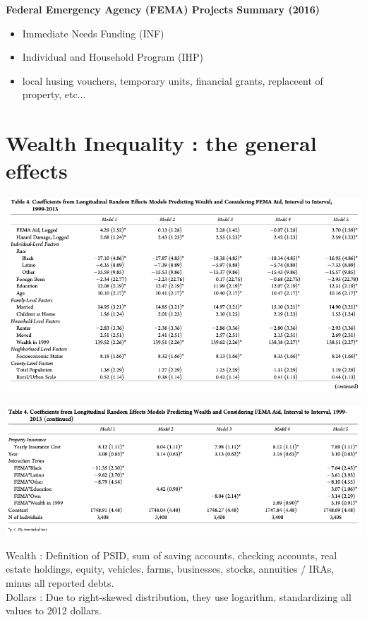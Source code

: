 \documentclass{beamer}
\begin{document}
\begin{frame}{\subsecname}
    \textbf{Federal Emergency Agency (FEMA) Projects Summary (2016)}
    \begin{itemize}
        \item Immediate Needs Funding (INF)
        \item Individual and Household Program (IHP)
        \item local husing vouchers, temporary units, financial grants, replaceent of property, etc...
    \end{itemize}
\end{frame}

\section{Wealth Inequality : the general effects}

    \begin{frame}{\secname}
        \includegraphics[totalheight=7cm,width=1\textwidth]{pictures/Table_4_1.png}
    \end{frame}

    \begin{frame}{\secname}
        \includegraphics[width=1\textwidth]{pictures/Table_4_2.png}
    \end{frame}

    \begin{frame}{\secname}
        Wealth : Definition of PSID, sum of saving accounts, checking accounts, real estate holdings, equity, vehicles,
        farms, businesses, stocks, annuities / IRAs, minus all reported debts.
        \\ Dollars : Due to right-skewed distribution, they use logarithm, standardizing all values to 2012 dollars. 
    \end{frame}
\end{document}
